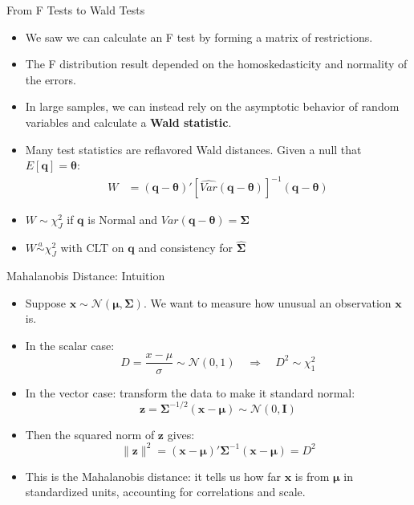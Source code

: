 \documentclass[aspectratio=169, handout, t]{beamer}
\numberwithin{equation}{section}
\begin{document}
\begin{frame}{From F Tests to Wald Tests}
\begin{itemize}
\item We saw we can calculate an F test by forming a matrix of restrictions.
\item The F distribution result depended on the homoskedasticity and normality of the errors.
\item In large samples, we can instead rely on the asymptotic behavior of random variables and calculate a \textbf{Wald statistic}.
\end{itemize}

\pause

\begin{itemize}
\item Many test statistics are reflavored Wald distances. Given a null that $E[\bm{q}]=\bm{\theta}$:
\begin{align*}
W &= (\bm{q}-\bm{\theta})'[\widehat{Var}(\bm{q}-\bm{\theta})]^{-1}(\bm{q}-\bm{\theta})
\end{align*}
\item $W \sim\chi^2_J$ if $\bm{q}$ is Normal and $Var(\bm{q}-\bm{\theta})=\bm{\Sigma}$
\item $W \overset{a}{\sim}\chi^2_J$ with CLT on $\bm{q}$ and consistency for $\bm{\hat{\Sigma}}$
\end{itemize}
\end{frame}


\begin{frame}{Mahalanobis Distance: Intuition}
\begin{itemize}
\item Suppose $\bm{x} \sim \mathcal{N}(\bm{\mu}, \bm{\Sigma})$. We want to measure how unusual an observation $\bm{x}$ is.

\item In the scalar case:
\[
D = \frac{x - \mu}{\sigma} \sim \mathcal{N}(0,1) \quad \Rightarrow \quad D^2 \sim \chi^2_1
\]

\item In the vector case: transform the data to make it standard normal:
\[
\bm{z} = \bm{\Sigma}^{-1/2} (\bm{x} - \bm{\mu}) \sim \mathcal{N}(0, \bm{I})
\]

\item Then the squared norm of $\bm{z}$ gives:
\[
\|\bm{z}\|^2 = (\bm{x} - \bm{\mu})' \bm{\Sigma}^{-1} (\bm{x} - \bm{\mu}) = D^2
\]

\item This is the Mahalanobis distance: it tells us how far $\bm{x}$ is from $\bm{\mu}$ in standardized units, accounting for correlations and scale.
\end{itemize}
\end{frame}
\end{document}
